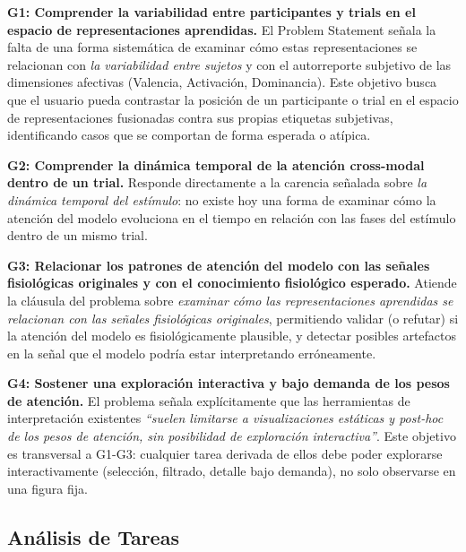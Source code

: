 \textbf{G1: Comprender la variabilidad entre participantes y trials en el espacio de representaciones aprendidas.} El Problem Statement señala la falta de una forma sistemática de examinar cómo estas representaciones se relacionan con \emph{la variabilidad entre sujetos} y con el autorreporte subjetivo de las dimensiones afectivas (Valencia, Activación, Dominancia). Este objetivo busca que el usuario pueda contrastar la posición de un participante o trial en el espacio de representaciones fusionadas contra sus propias etiquetas subjetivas, identificando casos que se comportan de forma esperada o atípica.

\textbf{G2: Comprender la dinámica temporal de la atención cross-modal dentro de un trial.} Responde directamente a la carencia señalada sobre \emph{la dinámica temporal del estímulo}: no existe hoy una forma de examinar cómo la atención del modelo evoluciona en el tiempo en relación con las fases del estímulo dentro de un mismo trial.

\textbf{G3: Relacionar los patrones de atención del modelo con las señales fisiológicas originales y con el conocimiento fisiológico esperado.} Atiende la cláusula del problema sobre \emph{examinar cómo las representaciones aprendidas se relacionan con las señales fisiológicas originales}, permitiendo validar (o refutar) si la atención del modelo es fisiológicamente plausible, y detectar posibles artefactos en la señal que el modelo podría estar interpretando erróneamente.

\textbf{G4: Sostener una exploración interactiva y bajo demanda de los pesos de atención.} El problema señala explícitamente que las herramientas de interpretación existentes \emph{``suelen limitarse a visualizaciones estáticas y post-hoc de los pesos de atención, sin posibilidad de exploración interactiva''}. Este objetivo es transversal a G1-G3: cualquier tarea derivada de ellos debe poder explorarse interactivamente (selección, filtrado, detalle bajo demanda), no solo observarse en una figura fija.







\subsection{Análisis de Tareas}\label{sec:task-analysis}

